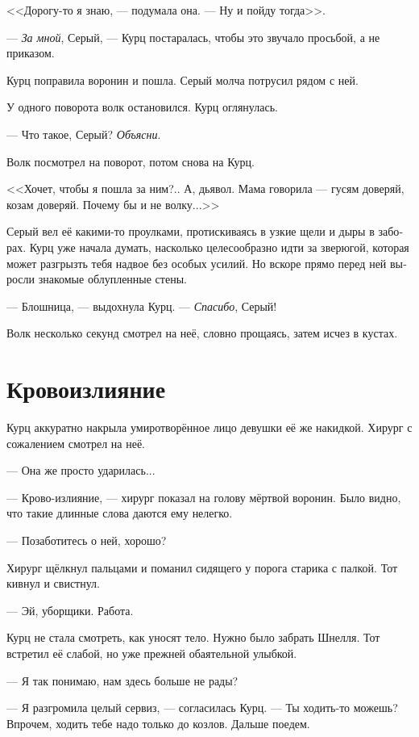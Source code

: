 \documentclass[a4paper,12pt,fleqn]{book}\usepackage{polyglossia}\setdefaultlanguage[babelshorthands=true]{russian}\setotherlanguage{english}\defaultfontfeatures{Ligatures=TeX,Mapping=tex-text}\usepackage{xcolor}\newcommand{\ml}[3]{#2}
\begin{document}
<<Дорогу-то я знаю, --- подумала она.
--- Ну и пойду тогда>>.

--- \textit{За мной}, Серый, --- Курц постаралась, чтобы это звучало просьбой, а не приказом.

Курц поправила воронин и пошла.
Серый молча потрусил рядом с ней.

У одного поворота волк остановился.
Курц оглянулась.

--- Что такое, Серый?
\textit{Объясни}.

Волк посмотрел на поворот, потом снова на Курц.

<<Хочет, чтобы я пошла за ним?..
А, дьявол.
Мама говорила --- гусям доверяй, козам доверяй.
Почему бы и не волку...>>

Серый вел её какими-то проулками, протискиваясь в узкие щели и дыры в заборах.
Курц уже начала думать, насколько целесообразно идти за зверюгой, которая может разгрызть тебя надвое без особых усилий.
Но вскоре прямо перед ней выросли знакомые облупленные стены.

--- Блошница, --- выдохнула Курц.
--- \textit{Спасибо}, Серый!

Волк несколько секунд смотрел на неё, словно прощаясь, затем исчез в кустах.

\section{Кровоизлияние}

Курц аккуратно накрыла умиротворённое лицо девушки её же накидкой.
Хирург с сожалением смотрел на неё.

--- Она же просто ударилась...

--- Крово-излияние, --- хирург показал на голову мёртвой воронин.
Было видно, что такие длинные слова даются ему нелегко.

--- Позаботитесь о ней, хорошо?

Хирург щёлкнул пальцами и поманил сидящего у порога старика с палкой.
Тот кивнул и свистнул.

--- Эй, уборщики.
Работа.

Курц не стала смотреть, как уносят тело.
Нужно было забрать Шнелля.
Тот встретил её слабой, но уже прежней обаятельной улыбкой.

--- Я так понимаю, нам здесь больше не рады?

--- Я разгромила целый сервиз, --- согласилась Курц.
--- Ты ходить-то можешь?
Впрочем, ходить тебе надо только до козлов.
Дальше поедем.
\end{document}
